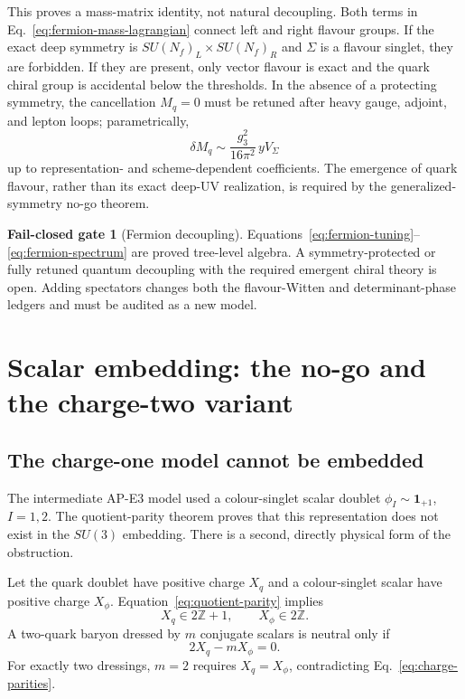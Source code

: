 \documentclass[11pt]{article}
\theoremstyle{definition}
\newtheorem{gate}[theorem]{Fail-closed gate}
\theoremstyle{remark}
\newcommand{\ZZ}{\mathbb Z}
\newcommand{\status}[1]{\textcolor{blue!60!black}{\textsf{#1}}}
\begin{document}
This proves a mass-matrix identity, not natural decoupling.  Both terms in
Eq.~\eqref{eq:fermion-mass-lagrangian} connect left and right flavour groups.
If the exact deep symmetry is
\(SU(N_f)_L\times SU(N_f)_R\) and \(\Sigma\) is a flavour singlet, they are
forbidden.  If they are present, only vector flavour is exact and the quark
chiral group is accidental below the thresholds.  In the absence of a
protecting symmetry, the cancellation \(M_q=0\) must be retuned after heavy
gauge, adjoint, and lepton loops; parametrically,
\begin{equation}
 \delta M_q\sim\frac{g_3^2}{16\pi^2}\,yV_\Sigma
 \label{eq:threshold-estimate}
\end{equation}
up to representation- and scheme-dependent coefficients.  The emergence of
quark flavour, rather than its exact deep-UV realization, is required by the
generalized-symmetry no-go theorem.

\begin{gate}[Fermion decoupling]
Equations~\eqref{eq:fermion-tuning}--\eqref{eq:fermion-spectrum} are
\status{proved tree-level algebra}.  A symmetry-protected or fully retuned
quantum decoupling with the required emergent chiral theory is \status{open}.
Adding spectators changes both the flavour-Witten and determinant-phase
ledgers and must be audited as a new model.
\end{gate}

\section{Scalar embedding: the no-go and the charge-two variant}

\subsection{The charge-one model cannot be embedded}

The intermediate AP-E3 model used a colour-singlet scalar doublet
\(\phi_I\sim\bm1_{+1}\), \(I=1,2\).  The quotient-parity theorem proves that
this representation does not exist in the \(SU(3)\) embedding.  There is a
second, directly physical form of the obstruction.

Let the quark doublet have positive charge \(X_q\) and a colour-singlet scalar
have positive charge \(X_\phi\).  Equation~\eqref{eq:quotient-parity} implies
\begin{equation}
 X_q\in2\ZZ+1,\qquad X_\phi\in2\ZZ.
 \label{eq:charge-parities}
\end{equation}
A two-quark baryon dressed by \(m\) conjugate scalars is neutral only if
\begin{equation}
 2X_q-mX_\phi=0.
 \label{eq:dressing-diophantine}
\end{equation}
For exactly two dressings, \(m=2\) requires
\(X_q=X_\phi\), contradicting Eq.~\eqref{eq:charge-parities}.
\end{document}
